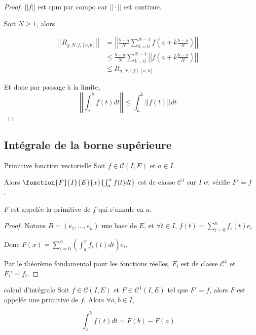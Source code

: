 
\begin{proof}
    $||f||$ est cpm par compo car $||\cdot||$ est continue.

    Soit $N \geqslant 1$, alors 

    \begin{align*}
        \left|\left| R_{g, N, f, [a, b]} \right|\right| & = \left|\left| \frac{b-a}{N} \sum_{k=0}^{N-1} f\left( a + k \frac{b-a}{N} \right) \right|\right| \\
        & \leqslant \frac{b-a}{N} \sum_{k=0}^{N-1} \left|\left| f\left( a + k \frac{b-a}{N} \right) \right|\right| \\
        & \leqslant R_{g, N, ||f||, [a, b]}
    \end{align*}

    Et donc par passage à la limite, 
    $$\left|\left| \int_a^b f(t) dt \right|\right| \leqslant \int_a^b ||f(t)|| dt$$
\end{proof}


\subsection{Intégrale de la borne supérieure }

\begin{theoreme}{Primitive fonction vectorielle}{}
    Soit $f \in \mathscr C(I, E)$ et $a \in I$. 

    Alors $\fonction{F}{I}{E}{x}{\int_a^x f(t) dt}$ est de classe $\mathscr C^1$ sur $I$ et 
    vérifie $F' = f$.

    $F$ est appelée la primitive de $f $ qui s'annule en $a$. 
\end{theoreme}


\begin{proof}
    Notons $B = (e_1, \ldots, e_n)$ une base de $E$, et $\forall t \in I, \, f(t) \displaystyle = \sum_{i = 0 }^{ n } f_i(t) e_i$

    Donc $\displaystyle F(x) = \sum_{i = 0 }^{ n } \left( \int_a^x f_i(t) dt \right) e_i$.

    Par le théorème fondamental pour les fonctions réelles, $F_i$ est de classe $\mathscr C^1$ et $F_i' = f_i$.
\end{proof}

\begin{corollaire}{calcul d'intégrale}{}
    Soit $f \in \mathscr C(I, E)$ et $F \in \mathscr C^1(I, E)$ tel que 
    $F' = f$, alors $F$ est appelée une primitive de $f$. Alors $\forall a, b \in I$, 
    
    $$\displaystyle \int_a^b f(t) dt = F(b) - F(a)$$
\end{corollaire}

